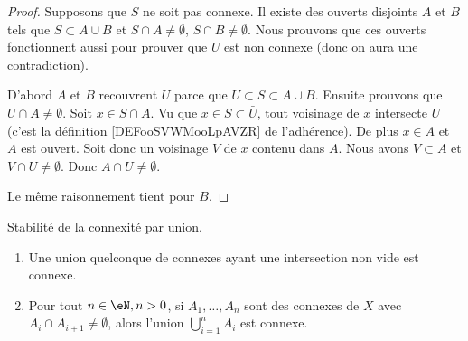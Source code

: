 \begin{proof}
    Supposons que \( S\) ne soit pas connexe. Il existe des ouverts disjoints \( A\) et \( B\) tels que \( S\subset A\cup B\) et \( S\cap A\neq\emptyset\), \( S\cap B\neq\emptyset\). Nous prouvons que ces ouverts fonctionnent aussi pour prouver que \( U\) est non connexe (donc on aura une contradiction).

    D'abord \( A\) et \( B\) recouvrent \( U\) parce que \( U\subset S\subset A\cup B\). Ensuite prouvons que \( U\cap A\neq \emptyset\). Soit \( x\in S\cap A\). Vu que \( x\in S\subset\bar U\), tout voisinage de \( x\) intersecte \( U\) (c'est la définition \ref{DEFooSVWMooLpAVZR} de l'adhérence). De plus \( x\in A\) et \( A\) est ouvert. Soit donc un voisinage \( V\) de \( x\) contenu dans \( A\). Nous avons \( V\subset A\) et \( V\cap U\neq \emptyset\). Donc \( A\cap U\neq \emptyset\).

    Le même raisonnement tient pour \( B\).
\end{proof}

\begin{proposition} \label{PropIWIDzzH}
	Stabilité de la connexité par union.
	\begin{enumerate}
		\item       \label{ITEMooLVSSooTGstBz}
		      Une union quelconque de connexes ayant une intersection non vide est connexe.
		\item
		      Pour tout \( n \in \eN, n > 0 \), si \( A_1,\ldots, A_n\) sont des connexes de \( X\) avec \( A_i\cap A_{i+1}\neq \emptyset\), alors l'union \( \bigcup_{i=1}^nA_i\) est connexe.
	\end{enumerate}
\end{proposition}

